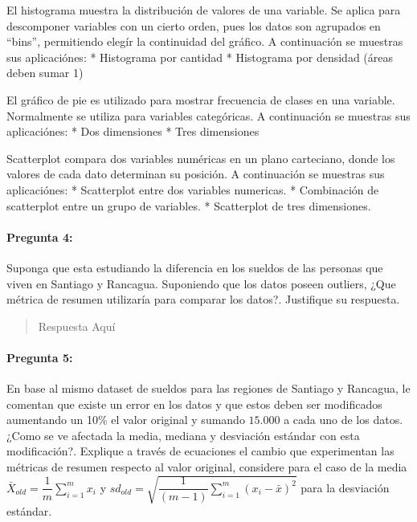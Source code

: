 \documentclass[]{article}
\let\oldparagraph\paragraph
\renewcommand{\paragraph}[1]{\oldparagraph{#1}\mbox{}}
\begin{document}
El histograma muestra la distribución de valores de una variable. Se
aplica para descomponer variables con un cierto orden, pues los datos
son agrupados en ``bins'', permitiendo elegír la continuidad del
gráfico. A continuación se muestras sus aplicaciónes: * Histograma por
cantidad * Histograma por densidad (áreas deben sumar 1)

El gráfico de pie es utilizado para mostrar frecuencia de clases en una
variable. Normalmente se utiliza para variables categóricas. A
continuación se muestras sus aplicaciónes: * Dos dimensiones * Tres
dimensiones

Scatterplot compara dos variables numéricas en un plano carteciano,
donde los valores de cada dato determinan su posición. A continuación se
muestras sus aplicaciónes: * Scatterplot entre dos variables numericas.
* Combinación de scatterplot entre un grupo de variables. * Scatterplot
de tres dimensiones.

\hypertarget{pregunta-4}{%
\paragraph{\texorpdfstring{\textbf{Pregunta
4:}}{Pregunta 4:}}\label{pregunta-4}}

Suponga que esta estudiando la diferencia en los sueldos de las personas
que viven en Santiago y Rancagua. Suponiendo que los datos poseen
outliers, ¿Que métrica de resumen utilizaría para comparar los datos?.
Justifique su respuesta.

\begin{quote}
Respuesta Aquí
\end{quote}

\hypertarget{pregunta-5}{%
\paragraph{\texorpdfstring{\textbf{Pregunta
5:}}{Pregunta 5:}}\label{pregunta-5}}

En base al mismo dataset de sueldos para las regiones de Santiago y
Rancagua, le comentan que existe un error en los datos y que estos deben
ser modificados aumentando un 10\% el valor original y sumando
\(15.000\) a cada uno de los datos. ¿Como se ve afectada la media,
mediana y desviación estándar con esta modificación?. Explique a través
de ecuaciones el cambio que experimentan las métricas de resumen
respecto al valor original, considere para el caso de la media
\(\bar{X}_{old} = \dfrac{1}{m} \sum^{m}_{i=1} x_i\) y
\(sd_{old} = \sqrt{\dfrac{1}{(m-1)}\sum_{i=1}^{m}(x_i-\bar{x})^{2}}\)
para la desviación estándar.
\end{document}
